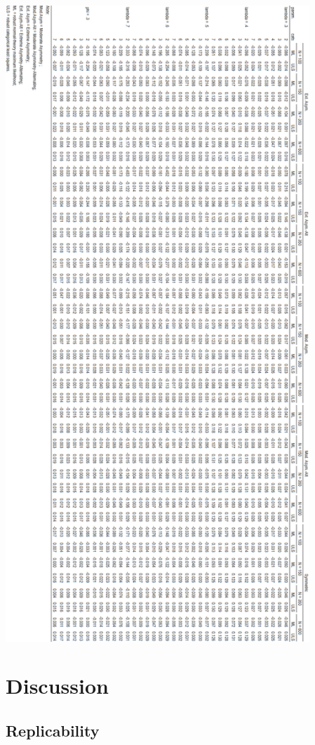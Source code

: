 \documentclass[10,a4paperpaper,]{article}
\begin{document}
\includegraphics[width=325pt]{./figures/tabA7}

\FloatBarrier
\section{Discussion}

\subsection{Replicability}
\end{document}
